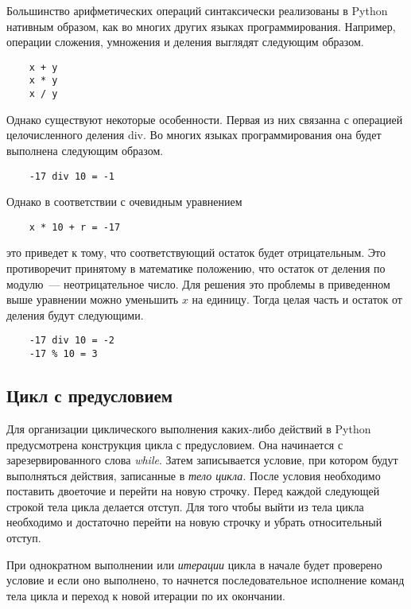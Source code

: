 \documentclass[a4paper, fleqn]{article}
\begin{document}
	Большинство арифметических операций синтаксически реализованы в Python нативным образом, как во многих других языках программирования. Например, операции сложения, умножения и деления выглядят следующим образом.
	\begin{lstlisting}
	x + y
	x * y
	x / y
	\end{lstlisting}
	
	Однако существуют некоторые особенности. Первая из них связанна с операцией целочисленного деления div. Во многих языках программирования она будет выполнена следующим образом.
	\begin{lstlisting}
	-17 div 10 = -1
	\end{lstlisting}
	
	Однако в соответствии с очевидным уравнением
	\begin{lstlisting}
	x * 10 + r = -17
	\end{lstlisting}
	это приведет к тому, что соответствующий остаток будет отрицательным. Это противоречит принятому в математике положению, что остаток от деления по модулю~--- неотрицательное число.
	Для решения это проблемы в приведенном выше уравнении можно уменьшить $x$ на единицу. Тогда целая часть и остаток от деления будут следующими.
	\begin{lstlisting}
	-17 div 10 = -2
	-17 % 10 = 3
	\end{lstlisting}
	
	\subsection*{Цикл с предусловием}
	
	Для организации циклического выполнения каких-либо действий в Python предусмотрена конструкция цикла с предусловием. Она начинается с зарезервированного слова \emph{while}. Затем записывается условие, при котором будут выполняться действия, записанные в \emph{тело цикла}. После условия необходимо поставить двоеточие и перейти на новую строчку.
	Перед каждой следующей строкой тела цикла делается отступ.
	Для того чтобы выйти из тела цикла необходимо и достаточно перейти на новую строчку и убрать относительный отступ.
	
	При однократном выполнении  или \emph{итерации} цикла в начале будет проверено условие и если оно выполнено, то начнется последовательное исполнение команд тела цикла и переход к новой итерации по их окончании. 
	
\end{document}
